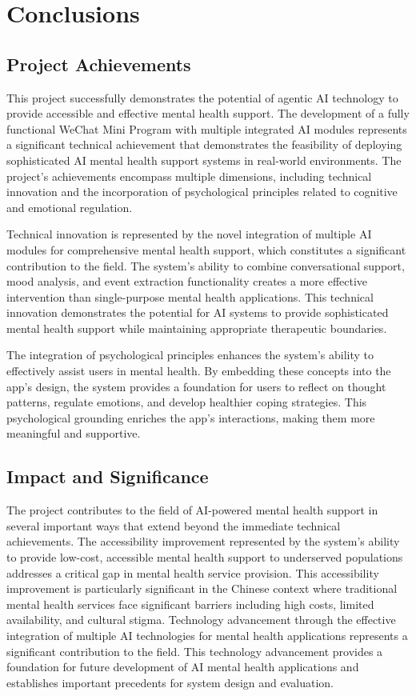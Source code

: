 \section{Conclusions}
\label{sec:conclusions}

\subsection{Project Achievements}

This project successfully demonstrates the potential of agentic AI technology to provide accessible and effective mental health support. The development of a fully functional WeChat Mini Program with multiple integrated AI modules represents a significant technical achievement that demonstrates the feasibility of deploying sophisticated AI mental health support systems in real-world environments. The project's achievements encompass multiple dimensions, including technical innovation and the incorporation of psychological principles related to cognitive and emotional regulation.

Technical innovation is represented by the novel integration of multiple AI modules for comprehensive mental health support, which constitutes a significant contribution to the field. The system's ability to combine conversational support, mood analysis, and event extraction functionality creates a more effective intervention than single-purpose mental health applications. This technical innovation demonstrates the potential for AI systems to provide sophisticated mental health support while maintaining appropriate therapeutic boundaries.

The integration of psychological principles enhances the system’s ability to effectively assist users in mental health. By embedding these concepts into the app's design, the system provides a foundation for users to reflect on thought patterns, regulate emotions, and develop healthier coping strategies. This psychological grounding enriches the app's interactions, making them more meaningful and supportive.

\subsection{Impact and Significance}

The project contributes to the field of AI-powered mental health support in several important ways that extend beyond the immediate technical achievements. The accessibility improvement represented by the system's ability to provide low-cost, accessible mental health support to underserved populations addresses a critical gap in mental health service provision. This accessibility improvement is particularly significant in the Chinese context where traditional mental health services face significant barriers including high costs, limited availability, and cultural stigma.
Technology advancement through the effective integration of multiple AI technologies for mental health applications represents a significant contribution to the field. This technology advancement provides a foundation for future development of AI mental health applications and establishes important precedents for system design and evaluation.

